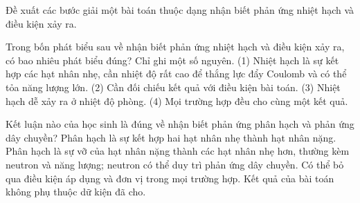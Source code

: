 \begin{bt}
Đề xuất các bước giải một bài toán thuộc dạng nhận biết phản ứng nhiệt hạch và điều kiện xảy ra.
\end{bt}

\begin{ex}
Trong bốn phát biểu sau về nhận biết phản ứng nhiệt hạch và điều kiện xảy ra, có bao nhiêu phát biểu đúng? Chỉ ghi một số nguyên. (1) Nhiệt hạch là sự kết hợp các hạt nhân nhẹ, cần nhiệt độ rất cao để thắng lực đẩy Coulomb và có thể tỏa năng lượng lớn. (2) Cần đối chiếu kết quả với điều kiện bài toán. (3) Nhiệt hạch dễ xảy ra ở nhiệt độ phòng. (4) Mọi trường hợp đều cho cùng một kết quả.
\end{ex}

\begin{ex}
Kết luận nào của học sinh là đúng về nhận biết phản ứng phân hạch và phản ứng dây chuyền?
\choice
{Phân hạch là sự kết hợp hai hạt nhân nhẹ thành hạt nhân nặng.}
{\True Phân hạch là sự vỡ của hạt nhân nặng thành các hạt nhân nhẹ hơn, thường kèm neutron và năng lượng; neutron có thể duy trì phản ứng dây chuyền.}
{Có thể bỏ qua điều kiện áp dụng và đơn vị trong mọi trường hợp.}
{Kết quả của bài toán không phụ thuộc dữ kiện đã cho.}
\end{ex}

